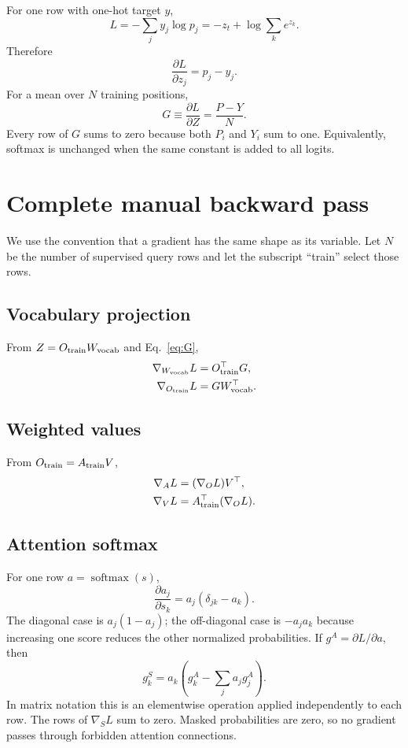 \documentclass[11pt]{article}
\newcommand{\softmax}{\operatorname{softmax}}
\newcommand{\grad}{\nabla}
\begin{document}
For one row with one-hot target $y$,
\[
  L=-\sum_jy_j\log p_j=-z_t+\log\sum_ke^{z_k}.
\]
Therefore
\[
  \frac{\partial L}{\partial z_j}=p_j-y_j.
\]
For a mean over $N$ training positions,
\begin{equation}
  G\equiv\frac{\partial L}{\partial Z}=\frac{P-Y}{N}.
  \label{eq:G}
\end{equation}
Every row of $G$ sums to zero because both $P_i$ and $Y_i$ sum to one. Equivalently, softmax is unchanged
when the same constant is added to all logits.

\section{Complete manual backward pass}

We use the convention that a gradient has the same shape as its variable. Let $N$ be the number of supervised
query rows and let the subscript ``train'' select those rows.

\subsection{Vocabulary projection}

From $Z=O_{\rm train}W_{\rm vocab}$ and Eq.~\eqref{eq:G},
\begin{align}
  \grad_{W_{\rm vocab}}L&=O_{\rm train}^\top G,\\
  \grad_{O_{\rm train}}L&=GW_{\rm vocab}^\top.
\end{align}

\subsection{Weighted values}

From $O_{\rm train}=A_{\rm train}V$,
\begin{align}
  \grad_A L&=(\grad_O L)V^\top,\\
  \grad_V L&=A_{\rm train}^\top(\grad_O L).
\end{align}

\subsection{Attention softmax}

For one row $a=\softmax(s)$,
\[
  \frac{\partial a_j}{\partial s_k}=a_j(\delta_{jk}-a_k).
\]
The diagonal case is $a_j(1-a_j)$; the off-diagonal case is $-a_ja_k$ because increasing one score
reduces the other normalized probabilities. If $g^A=\partial L/\partial a$, then
\begin{equation}
  g^S_k=a_k\left(g^A_k-\sum_j a_jg^A_j\right).
  \label{eq:softmaxback}
\end{equation}
In matrix notation this is an elementwise operation applied independently to each row. The rows of $\grad_S L$
sum to zero. Masked probabilities are zero, so no gradient passes through forbidden attention connections.
\end{document}
